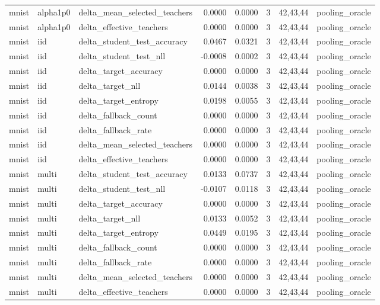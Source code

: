 \begin{tabular}{lllrrrll}
mnist & alpha1p0 & delta\_mean\_selected\_teachers & 0.0000 & 0.0000 & 3 & 42,43,44 & pooling\_oracle \\
mnist & alpha1p0 & delta\_effective\_teachers & 0.0000 & 0.0000 & 3 & 42,43,44 & pooling\_oracle \\
mnist & iid & delta\_student\_test\_accuracy & 0.0467 & 0.0321 & 3 & 42,43,44 & pooling\_oracle \\
mnist & iid & delta\_student\_test\_nll & -0.0008 & 0.0002 & 3 & 42,43,44 & pooling\_oracle \\
mnist & iid & delta\_target\_accuracy & 0.0000 & 0.0000 & 3 & 42,43,44 & pooling\_oracle \\
mnist & iid & delta\_target\_nll & 0.0144 & 0.0038 & 3 & 42,43,44 & pooling\_oracle \\
mnist & iid & delta\_target\_entropy & 0.0198 & 0.0055 & 3 & 42,43,44 & pooling\_oracle \\
mnist & iid & delta\_fallback\_count & 0.0000 & 0.0000 & 3 & 42,43,44 & pooling\_oracle \\
mnist & iid & delta\_fallback\_rate & 0.0000 & 0.0000 & 3 & 42,43,44 & pooling\_oracle \\
mnist & iid & delta\_mean\_selected\_teachers & 0.0000 & 0.0000 & 3 & 42,43,44 & pooling\_oracle \\
mnist & iid & delta\_effective\_teachers & 0.0000 & 0.0000 & 3 & 42,43,44 & pooling\_oracle \\
mnist & multi & delta\_student\_test\_accuracy & 0.0133 & 0.0737 & 3 & 42,43,44 & pooling\_oracle \\
mnist & multi & delta\_student\_test\_nll & -0.0107 & 0.0118 & 3 & 42,43,44 & pooling\_oracle \\
mnist & multi & delta\_target\_accuracy & 0.0000 & 0.0000 & 3 & 42,43,44 & pooling\_oracle \\
mnist & multi & delta\_target\_nll & 0.0133 & 0.0052 & 3 & 42,43,44 & pooling\_oracle \\
mnist & multi & delta\_target\_entropy & 0.0449 & 0.0195 & 3 & 42,43,44 & pooling\_oracle \\
mnist & multi & delta\_fallback\_count & 0.0000 & 0.0000 & 3 & 42,43,44 & pooling\_oracle \\
mnist & multi & delta\_fallback\_rate & 0.0000 & 0.0000 & 3 & 42,43,44 & pooling\_oracle \\
mnist & multi & delta\_mean\_selected\_teachers & 0.0000 & 0.0000 & 3 & 42,43,44 & pooling\_oracle \\
mnist & multi & delta\_effective\_teachers & 0.0000 & 0.0000 & 3 & 42,43,44 & pooling\_oracle \\

\end{tabular}
